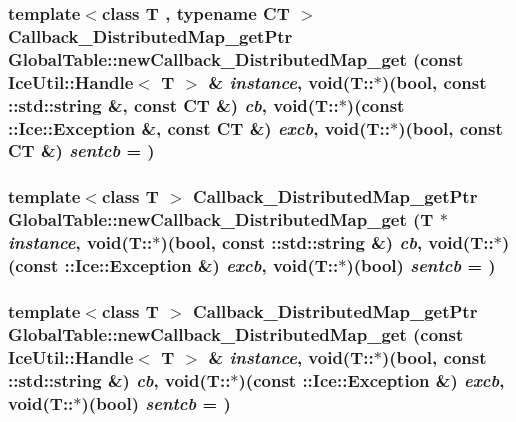 \hypertarget{namespace_global_table_a14348ba5f3f051f97678c758b8af8bf7}{
\subsubsection[{newCallback\_\-DistributedMap\_\-get}]{\setlength{\rightskip}{0pt plus 5cm}template$<$class T , typename CT $>$ {\bf Callback\_\-DistributedMap\_\-getPtr} GlobalTable::newCallback\_\-DistributedMap\_\-get (const IceUtil::Handle$<$ T $>$ \& {\em instance}, \/  void(T::$\ast$)(bool, const ::std::string \&, const CT \&) {\em cb}, \/  void(T::$\ast$)(const ::Ice::Exception \&, const CT \&) {\em excb}, \/  void(T::$\ast$)(bool, const CT \&) {\em sentcb} = {})}}
\label{namespace_global_table_a14348ba5f3f051f97678c758b8af8bf7}
\hypertarget{namespace_global_table_a60e527511f50c2742147c30bd1418631}{
\subsubsection[{newCallback\_\-DistributedMap\_\-get}]{\setlength{\rightskip}{0pt plus 5cm}template$<$class T $>$ {\bf Callback\_\-DistributedMap\_\-getPtr} GlobalTable::newCallback\_\-DistributedMap\_\-get (T $\ast$ {\em instance}, \/  void(T::$\ast$)(bool, const ::std::string \&) {\em cb}, \/  void(T::$\ast$)(const ::Ice::Exception \&) {\em excb}, \/  void(T::$\ast$)(bool) {\em sentcb} = {})}}
\label{namespace_global_table_a60e527511f50c2742147c30bd1418631}
\hypertarget{namespace_global_table_a315f9a738ac5bb0e7e62e036d6982743}{
\subsubsection[{newCallback\_\-DistributedMap\_\-get}]{\setlength{\rightskip}{0pt plus 5cm}template$<$class T $>$ {\bf Callback\_\-DistributedMap\_\-getPtr} GlobalTable::newCallback\_\-DistributedMap\_\-get (const IceUtil::Handle$<$ T $>$ \& {\em instance}, \/  void(T::$\ast$)(bool, const ::std::string \&) {\em cb}, \/  void(T::$\ast$)(const ::Ice::Exception \&) {\em excb}, \/  void(T::$\ast$)(bool) {\em sentcb} = {})}}
